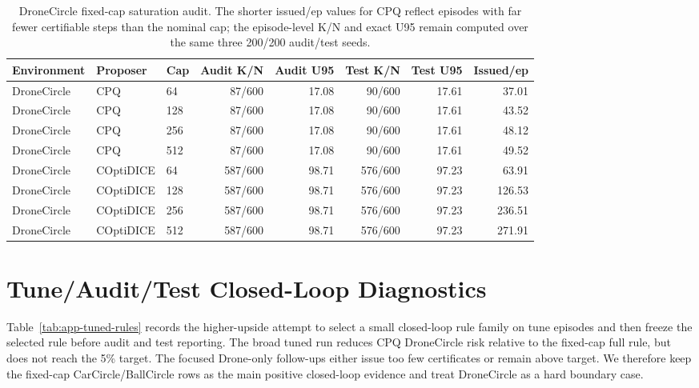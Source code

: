 \documentclass[letterpaper]{article}
\begin{document}
\begin{table}[t]
\centering
\scriptsize
\setlength{\tabcolsep}{3.5pt}
\begin{tabular}{lllrrrrr}
\toprule
Environment & Proposer & Cap & Audit K/N & Audit U95 & Test K/N & Test U95 & Issued/ep \\
\midrule
DroneCircle & CPQ & 64 & 87/600 & 17.08 & 90/600 & 17.61 & 37.01 \\
DroneCircle & CPQ & 128 & 87/600 & 17.08 & 90/600 & 17.61 & 43.52 \\
DroneCircle & CPQ & 256 & 87/600 & 17.08 & 90/600 & 17.61 & 48.12 \\
DroneCircle & CPQ & 512 & 87/600 & 17.08 & 90/600 & 17.61 & 49.52 \\
DroneCircle & COptiDICE & 64 & 587/600 & 98.71 & 576/600 & 97.23 & 63.91 \\
DroneCircle & COptiDICE & 128 & 587/600 & 98.71 & 576/600 & 97.23 & 126.53 \\
DroneCircle & COptiDICE & 256 & 587/600 & 98.71 & 576/600 & 97.23 & 236.51 \\
DroneCircle & COptiDICE & 512 & 587/600 & 98.71 & 576/600 & 97.23 & 271.91 \\
\bottomrule
\end{tabular}
\caption{DroneCircle fixed-cap saturation audit. The shorter issued/ep values
for CPQ reflect episodes with far fewer certifiable steps than the nominal cap;
the episode-level K/N and exact U95 remain computed over the same three
200/200 audit/test seeds.}
\label{tab:app-closed-loop-drone}
\end{table}

\section{Tune/Audit/Test Closed-Loop Diagnostics}

Table~\ref{tab:app-tuned-rules} records the higher-upside attempt to select a
small closed-loop rule family on tune episodes and then freeze the selected
rule before audit and test reporting. The broad tuned run reduces CPQ
DroneCircle risk relative to the fixed-cap full rule, but does not reach the
5\% target. The focused Drone-only follow-ups either issue too few certificates
or remain above target. We therefore keep the fixed-cap CarCircle/BallCircle
rows as the main positive closed-loop evidence and treat DroneCircle as a hard
boundary case.
\end{document}
